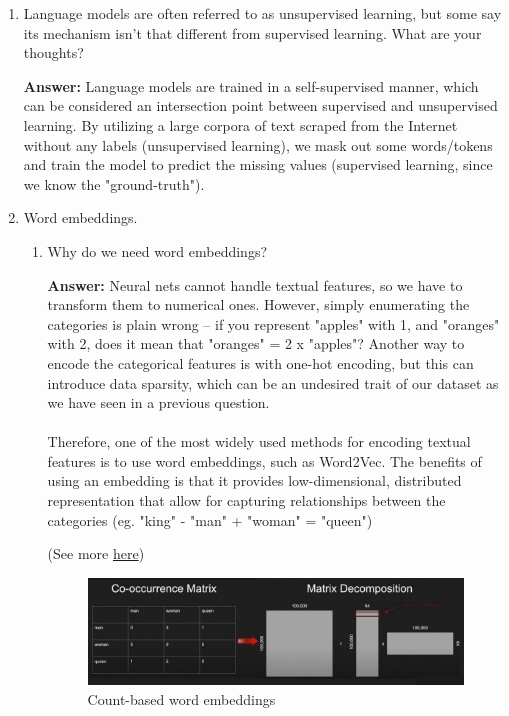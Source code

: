 \documentclass{article}
\newenvironment{QandA}{\begin{enumerate}[label=\arabic*.]}{\end{enumerate}}
\newenvironment{InnerQandA}{\begin{enumerate}[label=\roman*.]}{\end{enumerate}}
\newenvironment{answer}{\par\normalfont \textbf{Answer:}}{}
\begin{document}
\begin{QandA}
\begin{answer}
            (Source: \href{https://en.wikipedia.org/wiki/Density_estimation}{Wikipedia} \href{https://en.wikipedia.org/wiki/Language_model}{Wikipedia})
        \end{answer}
    

    \item Language models are often referred to as unsupervised learning, but some say its mechanism isn’t that different from supervised learning. What are your thoughts?
    \begin{answer}
        Language models are trained in a self-supervised manner, which can be considered an intersection point between supervised and unsupervised learning. By utilizing a large corpora of text scraped from the Internet without any labels (unsupervised learning), we mask out some words/tokens and train the model to predict the missing values (supervised learning, since we know the "ground-truth"). 
    \end{answer}

    \item Word embeddings.
    \begin{InnerQandA}
        \item Why do we need word embeddings?
        \begin{answer}
            Neural nets cannot handle textual features, so we have to transform them to numerical ones. However, simply enumerating the categories is plain wrong -- if you represent "apples" with 1, and "oranges" with 2, does it mean that "oranges" = 2 x "apples"? Another way to encode the categorical features is with one-hot encoding, but this can introduce data sparsity, which can be an undesired trait of our dataset as we have seen in a previous question. \\\\
            Therefore, one of the most widely used methods for encoding textual features is to use word embeddings, such as Word2Vec. The benefits of using an embedding is that it provides low-dimensional, distributed representation that allow for capturing relationships between the categories (eg. "king" - "man" + "woman" = "queen")
    
            (See more \href{https://www.fast.ai/2018/04/29/categorical-embeddings/}{here})
        \end{answer}

        \begin{figure}[ht!]
            \centering
            \includegraphics[width=0.8\columnwidth]{img/cooccurance.jpg}
            \caption{Count-based word embeddings}
            \label{fig:count-based-word-embeddings}
        \end{figure}


\end{InnerQandA}
\end{QandA}
\end{document}
